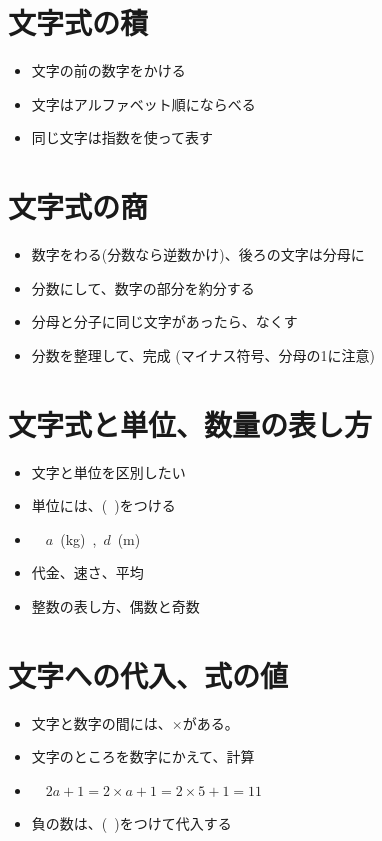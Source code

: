 \documentclass{jsarticle}
\begin{document}
\section{文字式の積}
\begin{itemize}
\item 文字の前の数字をかける
\item 文字はアルファベット順にならべる
\item 同じ文字は指数を使って表す
\end{itemize}

\section{文字式の商}
\begin{itemize}
\item 数字をわる(分数なら逆数かけ)、後ろの文字は分母に
\item 分数にして、数字の部分を約分する
\item 分母と分子に同じ文字があったら、なくす
\item 分数を整理して、完成 (マイナス符号、分母の1に注意)
\end{itemize}


\section{文字式と単位、数量の表し方}
\begin{itemize}
\item 文字と単位を区別したい
\item 単位には、(\ )をつける
\item {} \ \ $a$\ (kg)\ ,\ $d$\ (m)
\item 代金、速さ、平均
\item 整数の表し方、偶数と奇数
\end{itemize}


\section{文字への代入、式の値}
\begin{itemize}
\item 文字と数字の間には、$\times$がある。
\item 文字のところを数字にかえて、計算
\item {} \ \ $2a+1 = 2 \times a +1 = 2 \times 5 +1 =11$
\item 負の数は、(\ )をつけて代入する
\end{itemize}
\end{document}
